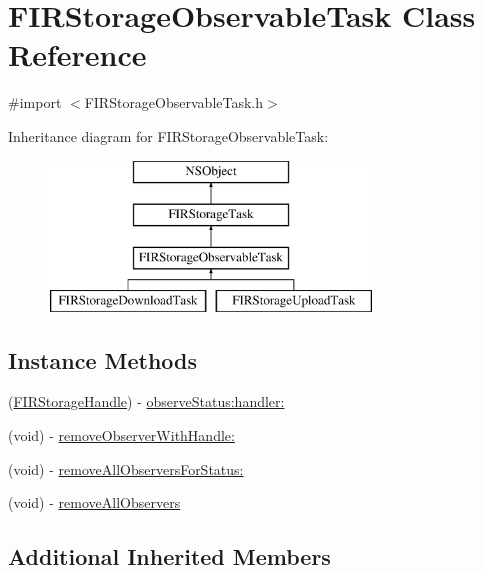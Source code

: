 \hypertarget{interface_f_i_r_storage_observable_task}{}\section{F\+I\+R\+Storage\+Observable\+Task Class Reference}
\label{interface_f_i_r_storage_observable_task}


{\ttfamily \#import $<$F\+I\+R\+Storage\+Observable\+Task.\+h$>$}

Inheritance diagram for F\+I\+R\+Storage\+Observable\+Task\+:\begin{figure}[H]
\begin{center}
\leavevmode
\includegraphics[height=4.000000cm]{interface_f_i_r_storage_observable_task}
\end{center}
\end{figure}
\subsection*{Instance Methods}
\begin{DoxyCompactItemize}
\item 
(\hyperlink{_f_i_r_storage_constants_8h_a4b4a51653670ef0159b5bacd10bc541d}{F\+I\+R\+Storage\+Handle}) -\/ \hyperlink{interface_f_i_r_storage_observable_task_a8782fe1abaf934d1a2e790e20a46dc6f}{observe\+Status\+:handler\+:}
\item 
(void) -\/ \hyperlink{interface_f_i_r_storage_observable_task_a26a592a88db9462a70d91741174c88c8}{remove\+Observer\+With\+Handle\+:}
\item 
(void) -\/ \hyperlink{interface_f_i_r_storage_observable_task_a50b536dbe022a878f5f6b0aabf6795ac}{remove\+All\+Observers\+For\+Status\+:}
\item 
(void) -\/ \hyperlink{interface_f_i_r_storage_observable_task_afac053f775258421be63085385a6b604}{remove\+All\+Observers}
\end{DoxyCompactItemize}
\subsection*{Additional Inherited Members}


